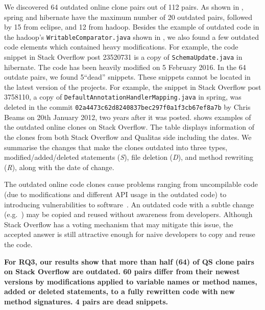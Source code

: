\documentclass[sigconf,review, anonymous]{acmart}
\begin{document}
We discovered 64 outdated online clone pairs out of 112 pairs. As shown in , \textsf{spring} and \textsf{hibernate} have the maximum number of 20 outdated pairs, followed by 15 from \textsf{eclipse}, and 12 from \textsf{hadoop}. Besides the example of outdated code in the \textsf{hadoop}'s {\small{\texttt{WritableComparator.java}}} shown in , we also found a few outdated code elements which contained heavy modifications. For example, the code snippet in Stack Overflow post 23520731 is a copy of {\small{\texttt{SchemaUpdate.java}}} in \textsf{hibernate}. The code has been heavily modified on 5 February 2016. In the 64 outdate pairs, we found 5``dead'' snippets. These snippets cannot be located in the latest version of the projects. For example, the snippet in Stack Overflow post 3758110, a copy of {\small{\texttt{DefaultAnnotationHandlerMapping.java}}} in \textsf{spring}, was deleted in the commit {\small{\texttt{02a4473c62d8240837bec297f0a1f3cb67ef8a7b}}} by Chris Beams on 20th January 2012, two years after it was posted. %
 shows examples of the outdated online clones on Stack Overflow. The table displays information of the clones from both Stack Overflow and Qualitas side including the dates. We summarise the changes that make the clones outdated into three types, modified/added/deleted statements (\textit{S}), file deletion (\textit{D}), and method rewriting (\textit{R}), along with the date of change.

The outdated online code clones cause problems ranging from uncompilable code (due to modifications and different API usage in the outdated code) to introducing vulnerabilities to software~\cite{Xia2014}. An outdated code with a subtle change (e.g.~) may be copied and reused without awareness from developers. Although Stack Overflow has a voting mechanism that may mitigate this issue, the accepted answer is still attractive enough for naive developers to copy and reuse the code.

\textbf{For RQ3, our results show that more than half (64) of QS clone pairs on Stack Overflow are outdated. 60 pairs differ from their newest versions by modifications applied to variable names or method names, added or deleted statements, to a fully rewritten code with new method signatures. 4 pairs are dead snippets.} %
\end{document}
